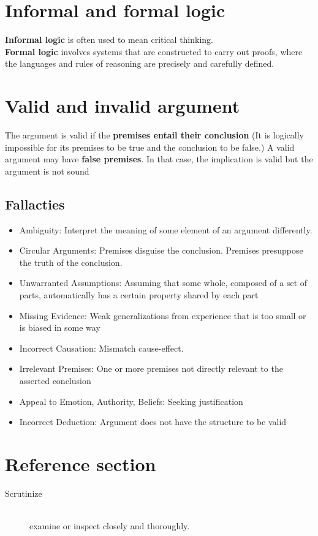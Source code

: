 \documentclass{article}
\begin{document}
\section{Informal and formal logic}
\begin{flushleft}
\textbf{Informal logic} is often used to mean critical thinking. \\
\textbf{Formal logic} involves systems that are constructed to carry out proofs, where the languages and rules of reasoning are precisely and carefully defined.
\end{flushleft}

\section{Valid and invalid argument}
\begin{flushleft}
The argument is valid if the \textbf{premises entail their conclusion} (It is logically impossible for its premises to be true and the conclusion to be false.) A valid argument may have \textbf{false premises}. In that case, the implication is valid but the argument is not sound 
\end{flushleft}

\subsection{Fallacties}
\begin{itemize}
  \item Ambiguity: Interpret the meaning of some element of an argument differently.
  \item Circular Arguments: Premises disguise the conclusion. Premises presuppose the truth of the conclusion.
  \item Unwarranted Assumptions: Assuming that some whole, composed of a set of parts, automatically has a certain property shared by each part
  \item Missing Evidence: Weak generalizations from experience that is too small or is biased in some way
  \item Incorrect Causation: Mismatch cause-effect.
  \item Irrelevant Premises: One or more premises not directly relevant to the asserted conclusion
  \item Appeal to Emotion, Authority, Beliefs: Seeking justification
  \item Incorrect Deduction: Argument does not have the structure to be valid
\end{itemize}

\pagebreak
\section*{Reference section} \label{sec:reference}
\begin{description}
	\item[Scrutinize] \hfill \\ examine or inspect closely and thoroughly.
\end{description}
\end{document}
